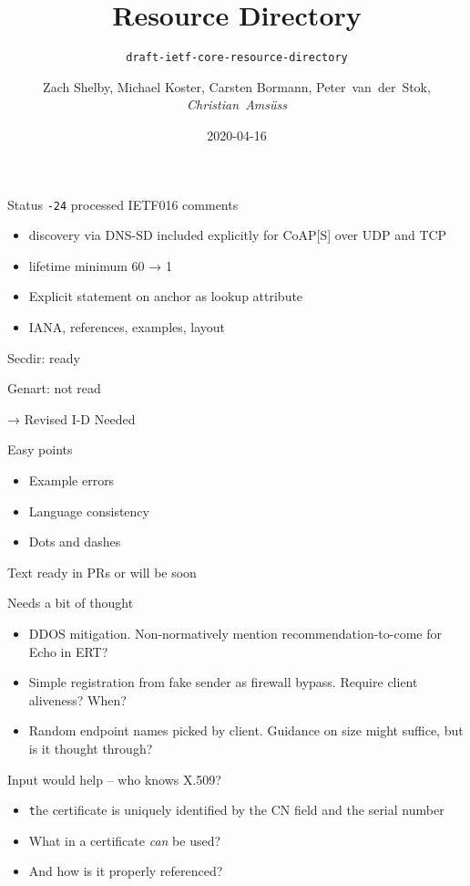 \documentclass[aspectratio=169]{beamer}
\title{Resource Directory}
\subtitle{\texttt{draft-ietf-core-resource-directory}}
\author{Zach Shelby, Michael Koster, Carsten Bormann, Peter~van~der~Stok, \textit{Christian~Amsüss}}
\date{2020-04-16}
\begin{document}
\frame{\titlepage}

\begin{frame}{Status}\Large
	\texttt{-24} processed IETF016 comments

	\bigskip

	{\normalsize\begin{itemize}
		\item discovery via DNS-SD included explicitly for CoAP[S] over UDP and TCP
		\item lifetime minimum 60 → 1
		\item Explicit statement on anchor as lookup attribute
		\item IANA, references, examples, layout
	\end{itemize}}

	\bigskip

	Secdir: ready

	Genart: not read

	→ Revised I-D Needed
\end{frame}

\begin{frame}{Easy points}\Large
	\begin{itemize}
		\item Example errors
		\item Language consistency
		\item Dots and dashes
	\end{itemize}

	\bigskip

	Text ready in PRs or will be soon
\end{frame}

\begin{frame}{Needs a bit of thought}\Large
	\begin{itemize}
		\item DDOS mitigation. Non-normatively mention recommendation-to-come for Echo in ERT?
		\item Simple registration from fake sender as firewall bypass. Require client aliveness? When?
		\item Random endpoint names picked by client. Guidance on size might suffice, but is it thought through?
	\end{itemize}
\end{frame}

\begin{frame}{Input would help -- who knows X.509?}\Large
	\begin{itemize}
		\item {\texttt the certificate is uniquely identified by the CN field and the serial number}
		\item What in a certificate {\em can} be used?
		\item And how is it properly referenced?
	\end{itemize}
\end{frame}
\end{document}
